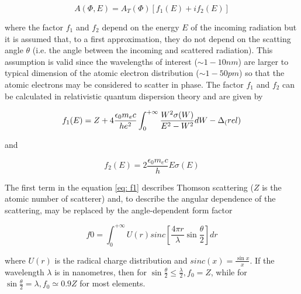 \begin{equation}
A(\Phi, E) = A_T(\Phi) [f_1(E) + if_2(E)]
\label{eq: A(fi, E)}
\end{equation}

\begin{flushleft}
where the factor $f_1 $ and $f_2 $ depend on the energy $E $ of the incoming radiation but it is assumed that, to a first approximation, they do not depend on the scatting angle $\theta $ (i.e. the angle between the incoming and scattered radiation). This assumption is valid since the wavelengths of interest ($\sim 1-10nm $) are larger to typical dimension of the atomic electron distribution ($\sim 1-50pm $) so that the atomic electrons may  be considered to scatter in phase. The factor $f_1 $ and $f_2 $ can be calculated in relativistic quantum dispersion theory and are given by 
\end{flushleft}

\begin{equation}
f_1(E) = Z + 4 \frac{\epsilon_0 m_e c}{h e^2} \int_{0}^{+ \infty}\frac{W^2 \sigma(W)}{E^2 - W^2} dW - \Delta \textsubscript(rel)
\label{eq: f1}
\end{equation}

\begin{flushleft}
and
\end{flushleft}

\begin{equation}
f_2(E) = 2 \frac{\epsilon_0 m_e c}{h} E \sigma(E)
\label{eq: f2}
\end{equation}

\begin{flushleft}
The first term in the equation \ref{eq: f1} describes Thomson scattering ($Z $ is the atomic number of scatterer) and, to describe the angular dependence of the scattering, may be replaced by the angle-dependent form factor
\end{flushleft}

\begin{equation}
f0 = \int_{0}^{+ \infty} U(r) sinc[\frac{4 \pi r}{\lambda} \sin \frac{\theta}{2}] dr
\label{f0}
\end{equation}

\begin{flushleft}
where $U(r) $ is the radical charge distribution and $sinc(x) = \frac{\sin x}{x} $. If the wavelength $\lambda $ is in nanometres, then for $\sin \frac{\theta}{2} \leq \frac{\lambda}{2}, f_0=Z $, while for $\sin \frac{\theta}{2}=\lambda, f_0 \simeq 0.9Z $ for most elements.
\end{flushleft}

